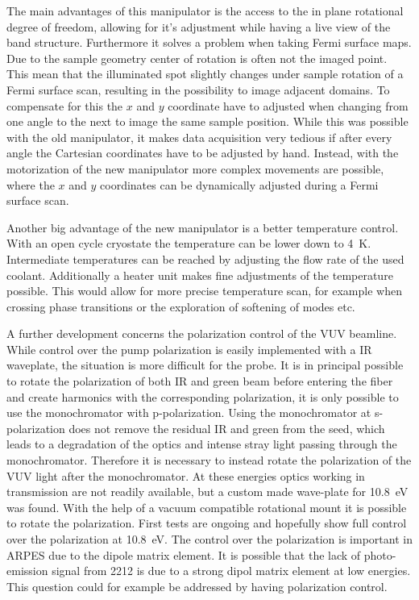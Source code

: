 The main advantages of this manipulator is the access to the in plane rotational degree of freedom, allowing for it's adjustment while having a live view of the band structure.
Furthermore it solves a problem when taking Fermi surface maps.
Due to the sample geometry center of rotation is often not the imaged point.
This mean that the illuminated spot slightly changes under sample rotation of a Fermi surface scan, resulting in the possibility to image adjacent domains.
To compensate for this the $x$ and $y$ coordinate have to adjusted when changing from one angle to the next to image the same sample position.
While this was possible with the old manipulator, it makes data acquisition very tedious if after every angle the Cartesian coordinates have to be adjusted by hand.
Instead, with the motorization of the new manipulator more complex movements are possible, where the $x$ and $y$ coordinates can be dynamically adjusted during a Fermi surface scan.

Another big advantage of the new manipulator is a better temperature control.
With an open cycle cryostate the temperature can be lower down to \qty{4}{\kelvin}.
Intermediate temperatures can be reached by adjusting the flow rate of the used coolant.
Additionally a heater unit makes fine adjustments of the temperature possible.
This would allow for more precise temperature scan, for example when crossing phase transitions or the exploration of softening of modes etc.

A further development concerns the polarization control of the VUV beamline.
While control over the pump polarization is easily implemented with a IR waveplate, the situation is more difficult for the probe.
It is in principal possible to rotate the polarization of both IR and green beam before entering the fiber and create harmonics with the corresponding polarization, it is only possible to use the monochromator with p-polarization.
Using the monochromator at s-polarization does not remove the residual IR and green from the seed, which leads to a degradation of the optics and intense stray light passing through the monochromator.
Therefore it is necessary to instead rotate the polarization of the VUV light after the monochromator.
At these energies optics working in transmission are not readily available, but a custom made wave-plate for \qty{10.8}{\electronvolt} was found.
With the help of a vacuum compatible rotational mount it is possible to rotate the polarization.
First tests are ongoing and hopefully show full control over the polarization at \qty{10.8}{\electronvolt}.
The control over the polarization is important in ARPES due to the dipole matrix element.
It is possible that the lack of photo-emission signal from 2212 is due to a strong dipol matrix element at low energies.
This question could for example be addressed by having polarization control.


